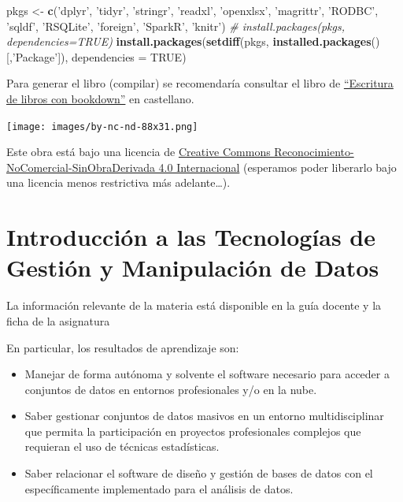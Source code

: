 \documentclass[]{book}
\newenvironment{Shaded}{\begin{snugshade}}{\end{snugshade}}
\newcommand{\CommentTok}[1]{\textcolor[rgb]{0.56,0.35,0.01}{\textit{#1}}}
\newcommand{\DataTypeTok}[1]{\textcolor[rgb]{0.13,0.29,0.53}{#1}}
\newcommand{\KeywordTok}[1]{\textcolor[rgb]{0.13,0.29,0.53}{\textbf{#1}}}
\newcommand{\NormalTok}[1]{#1}
\newcommand{\OtherTok}[1]{\textcolor[rgb]{0.56,0.35,0.01}{#1}}
\newcommand{\StringTok}[1]{\textcolor[rgb]{0.31,0.60,0.02}{#1}}
\begin{document}
\begin{Shaded}
\begin{Highlighting}[]
\NormalTok{pkgs <-}\StringTok{ }\KeywordTok{c}\NormalTok{(}\StringTok{'dplyr'}\NormalTok{, }\StringTok{'tidyr'}\NormalTok{, }\StringTok{'stringr'}\NormalTok{, }\StringTok{'readxl'}\NormalTok{, }\StringTok{'openxlsx'}\NormalTok{, }\StringTok{'magrittr'}\NormalTok{, }
          \StringTok{'RODBC'}\NormalTok{, }\StringTok{'sqldf'}\NormalTok{, }\StringTok{'RSQLite'}\NormalTok{, }\StringTok{'foreign'}\NormalTok{, }\StringTok{'SparkR'}\NormalTok{, }\StringTok{'knitr'}\NormalTok{)}
\CommentTok{# install.packages(pkgs, dependencies=TRUE)}
\KeywordTok{install.packages}\NormalTok{(}\KeywordTok{setdiff}\NormalTok{(pkgs, }\KeywordTok{installed.packages}\NormalTok{()[,}\StringTok{'Package'}\NormalTok{]), }\DataTypeTok{dependencies =} \OtherTok{TRUE}\NormalTok{)}
\end{Highlighting}
\end{Shaded}

Para generar el libro (compilar) se recomendaría consultar el libro de \href{https://rubenfcasal.github.io/bookdown_intro}{``Escritura de libros con bookdown''} en castellano.

\texttt{[image: images/by-nc-nd-88x31.png]}

Este obra está bajo una licencia de \href{https://creativecommons.org/licenses/by-nc-nd/4.0/deed.es_ES}{Creative Commons Reconocimiento-NoComercial-SinObraDerivada 4.0 Internacional}
(esperamos poder liberarlo bajo una licencia menos restrictiva más adelante\ldots{}).

\hypertarget{introduccion-a-las-tecnologias-de-gestion-y-manipulacion-de-datos}{%
\chapter{Introducción a las Tecnologías de Gestión y Manipulación de Datos}\label{introduccion-a-las-tecnologias-de-gestion-y-manipulacion-de-datos}}

La información relevante de la materia está disponible en la guía docente y la ficha de la asignatura

En particular, los resultados de aprendizaje son:

\begin{itemize}
\item
  Manejar de forma autónoma y solvente el software necesario para acceder a conjuntos de datos en entornos profesionales y/o en la nube.
\item
  Saber gestionar conjuntos de datos masivos en un entorno multidisciplinar que permita la participación en proyectos profesionales complejos que requieran el uso de técnicas estadísticas.
\item
  Saber relacionar el software de diseño y gestión de bases de datos con el específicamente implementado para el análisis de datos.
\end{itemize}
\end{document}
